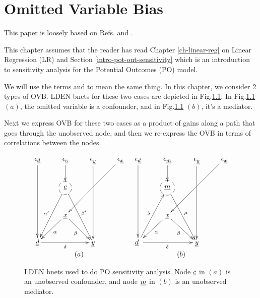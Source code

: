 \chapter{Omitted Variable Bias}
\label{ch-omitted-var-bias}

This paper is
loosely based on Refs.\cite{cinelli-haz}
and \cite{cherno-cinelli}.

This chapter assumes that the
reader has read Chapter
\ref{ch-linear-reg}
on Linear Regression (LR)
and Section \ref{intro-pot-out-sensitivity}
which is an introduction
to sensitivity analysis
for the Potential Outcomes (PO)
model.

We will
 use the terms {\bf {}}
and {\bf {}}
to mean the same thing.
In this chapter,
we consider 2 types 
of OVB. LDEN bnets for
these two cases are depicted in Fig.\ref{fig-ovb-two-lden}.
In Fig.\ref{fig-ovb-two-lden}$(a)$, the omitted variable
is a confounder,
and in Fig.\ref{fig-ovb-two-lden} $(b)$,
it's a mediator.

Next we express OVB for these two cases as
a product of gains along a path
that goes through the unobserved node, and then we re-express the OVB 
in terms of correlations between the nodes.
 


\begin{figure}[h!]
$$
\begin{array}{cc}
\xymatrix{
\eps_\rvd\ar[ddd]
&\eps_\rvc\ar[d]
&\eps_\rvy\ar[ddd]
&\eps_\rvx\ar[ddll]
\\
&*++[F-o]{\rvc}\ar[ldd]_{\alp'}
\ar[rdd]^{\beta'}
\\
&\rvx
\ar[ld]^\alp
\ar[rd]_\beta
\\
\rvd\ar[rr]_\delta
&&\rvy
}
&
\xymatrix{
\eps_\rvd\ar[ddd]
&\eps_\rvm\ar[d]
&\eps_\rvy\ar[ddd]
&\eps_\rvx\ar[ddll]
\\
&*++[F-o]{\rvm}
\ar[rdd]^{\mu}
\\
&\rvx
\ar[ld]^\alp
\ar[rd]_\beta
\\
\rvd\ar[rr]_\delta
\
\ar[ruu]^\lam
&&\rvy
}
\\
(a)&(b)
\end{array}
$$
\caption{LDEN bnets used to do PO
sensitivity analysis.
Node $\rvc$ in $(a)$
is an unobserved confounder,
and node $\rvm$ in $(b)$
is an unobserved mediator.}
\label{fig-ovb-two-lden}
\end{figure}







